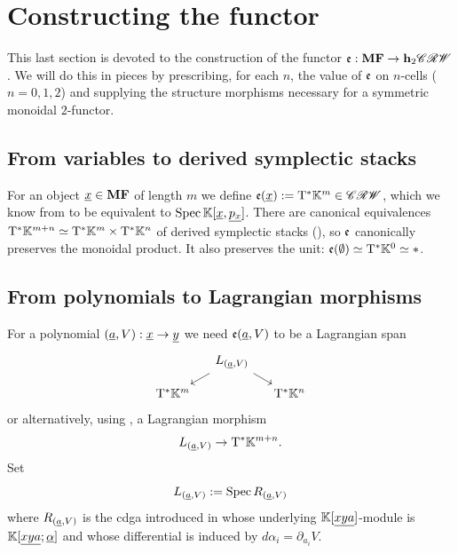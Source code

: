 \section{Constructing the functor} \label{sec:functor}

This last section is devoted to the construction of the functor $\mathfrak{e} : \mathbf{MF} \to \mathbf{h}_2 \mathscr{CRW}$. We will do this in pieces by prescribing, for each $n$, the value of $\mathfrak{e}$ on $n$-cells ($n = 0,1,2$) and supplying the structure morphisms necessary for a symmetric monoidal $2$-functor.

\subsection{From variables to derived symplectic stacks} \label{sec:e-0}

For an object $\underline{x} \in \mathbf{MF}$ of length $m$ we define $\mathfrak{e}(\underline{x}) := \mathrm{T}^\ast \mathbb{K}^m \in \mathscr{CRW}$, which we know from  to be equivalent to $\operatorname{Spec} \mathbb{K}[\underline{x}, \underline{p_x}]$. There are canonical equivalences $\mathrm{T}^\ast \mathbb{K}^{m+n} \simeq \mathrm{T}^\ast \mathbb{K}^m \times \mathrm{T}^\ast \mathbb{K}^n$ of derived symplectic stacks (), so $\mathfrak{e}$ canonically preserves the monoidal product. It also preserves the unit: $\mathfrak{e}(\emptyset) \simeq \mathrm{T}^\ast \mathbb{K}^0 \simeq \ast$.

\subsection{From polynomials to Lagrangian morphisms}

For a polynomial $(\underline{a}, V) : \underline{x} \to \underline{y}$ we need $\mathfrak{e}(\underline{a}, V)$ to be a Lagrangian span
\begin{equation*}
	\begin{tikzcd}[column sep = small, row sep = small]
		& L_{(\undl{a}, V)} \ar[dl] \ar[dr] & \\
		\bT^\ast \KK^m & & \bT^\ast \KK^n
	\end{tikzcd}
\end{equation*}
or alternatively, using , a Lagrangian morphism
\begin{equation*}
	L_{(\underline{a}, V)} \to \mathrm{T}^\ast \mathbb{K}^{m+n}.
\end{equation*}
Set
\begin{equation*}
	L_{(\underline{a},V)} := \operatorname{Spec} R_{(\underline{a},V)}
\end{equation*}
where $R_{(\underline{a},V)}$ is the cdga introduced in  whose underlying $\mathbb{K}[\underline{xya}]$-module is $\mathbb{K}[\underline{xya};\underline{\alpha}]$ and whose differential is induced by $d \alpha_i = \partial_{a_i} V$.

